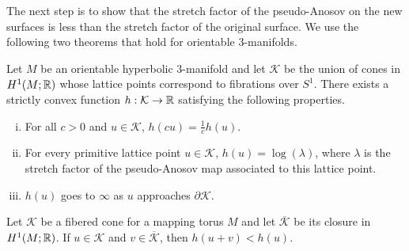 The next step is to show that the stretch factor of the pseudo-Anosov on the new surfaces is less than the stretch factor of the original surface.  We use the following two theorems that hold for orientable 3-manifolds.

\begin{thm}
  \label{thm:fm}
  Let $M$ be an orientable hyperbolic $3$-manifold and let $\mathcal{K}$ be the union of cones in $H^1(M; \mathbb{R})$ whose lattice points correspond to fibrations over $S^1$.
  There exists a strictly convex function $h: \mathcal{K} \to \mathbb{R}$ satisfying the following properties.
  \begin{enumerate}[(i)]
  \item For all $c > 0$ and $u \in \mathcal{K}$, $h(cu) =  \frac{1}{c}h(u)$.
  \item For every primitive lattice point $u \in \mathcal{K}$, $h(u) = \log(\lambda)$, where $\lambda$ is the
    stretch factor of the pseudo-Anosov map associated to this lattice point.
  \item $h(u)$ goes to $\infty$ as $u$ approaches $\partial \mathcal{K}$.
  \end{enumerate}
\end{thm}

\begin{thm}
  \label{thm:alm}
  Let $\mathcal{K}$ be a fibered cone for a mapping torus $M$ and let $\overline{\mathcal{K}}$ be its closure
  in $H^1(M;\mathbb{R})$. If $u \in \mathcal{K}$ and $v \in \overline{\mathcal{K}}$, then $h(u+v) < h(u)$.
\end{thm}

